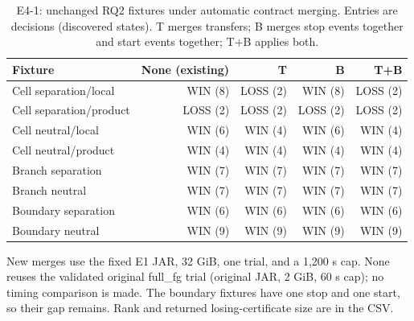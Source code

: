 \begin{table}[t]
\centering\small
\caption{E4-1: unchanged RQ2 fixtures under automatic contract merging. Entries are decisions (discovered states). T merges transfers; B merges stop events together and start events together; T+B applies both.}
\begin{tabular}{lrrrr}
\toprule
Fixture & None (existing) & T & B & T+B \\
\midrule
Cell separation/local & WIN (8) & LOSS (2) & WIN (8) & LOSS (2) \\
Cell separation/product & LOSS (2) & LOSS (2) & LOSS (2) & LOSS (2) \\
Cell neutral/local & WIN (6) & WIN (4) & WIN (6) & WIN (4) \\
Cell neutral/product & WIN (4) & WIN (4) & WIN (4) & WIN (4) \\
Branch separation & WIN (7) & WIN (7) & WIN (7) & WIN (7) \\
Branch neutral & WIN (7) & WIN (7) & WIN (7) & WIN (7) \\
Boundary separation & WIN (6) & WIN (6) & WIN (6) & WIN (6) \\
Boundary neutral & WIN (9) & WIN (9) & WIN (9) & WIN (9) \\
\bottomrule
\end{tabular}
\par\footnotesize New merges use the fixed E1 JAR, 32 GiB, one trial, and a 1,200 s cap. None reuses the validated original full\_fg trial (original JAR, 2 GiB, 60 s cap); no timing comparison is made. The boundary fixtures have one stop and one start, so their gap remains. Rank and returned losing-certificate size are in the CSV.
\end{table}
